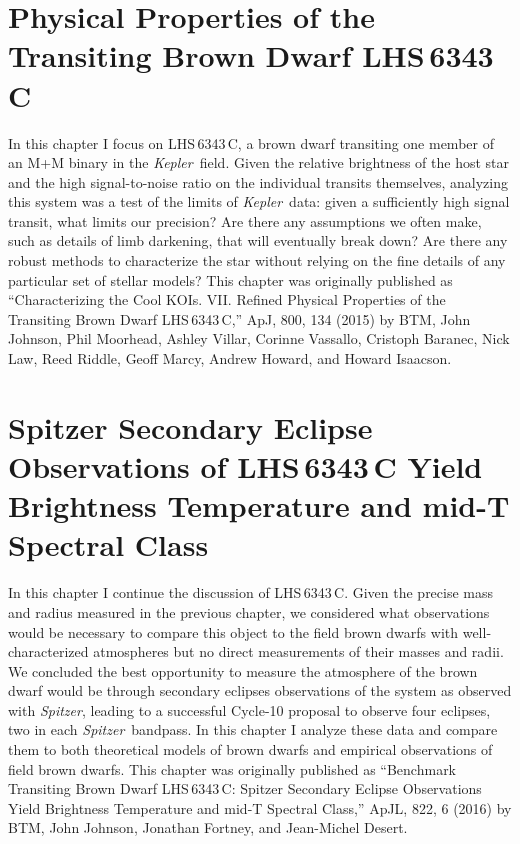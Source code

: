\documentclass[12pt]{caltech_thesis}
\newcommand{\kep}{{\textit {Kepler}}}
\newcommand{\spitz}{{\textit {Spitzer}}}
\begin{document}


\chapter{Physical Properties of the Transiting Brown Dwarf LHS\,6343\,C}
\label{chap:lhs1}


In this chapter I focus on LHS\,6343\,C, a brown dwarf transiting one member of an M+M binary in the \kep\ field.
Given the relative brightness of the host star and the high signal-to-noise ratio on the individual transits themselves,
analyzing this system was a test of the limits of \kep\ data: given a sufficiently high signal transit, what limits our precision?
Are there any assumptions we often make, such as details of limb darkening, that will eventually break down? 
Are there any robust methods to characterize the star without relying on the fine details of any particular set of stellar models?
This chapter was originally published as ``Characterizing the Cool KOIs. VII. Refined Physical Properties of the Transiting Brown Dwarf LHS\,6343\,C,'' ApJ, 800, 134 (2015) by BTM, John Johnson, Phil Moorhead, Ashley Villar, Corinne Vassallo,
Cristoph Baranec, Nick Law, Reed Riddle, Geoff Marcy, Andrew Howard, and Howard Isaacson.



\chapter{Spitzer Secondary Eclipse Observations of LHS\,6343\,C Yield Brightness Temperature and mid-T Spectral Class}

\label{chap:lhsspitz}
In this chapter I continue the discussion of LHS\,6343\,C.
Given the precise mass and radius measured in the previous chapter, we considered what observations would be necessary
to compare this object to the field brown dwarfs with well-characterized atmospheres but no direct measurements of
their masses and radii.
We concluded the best opportunity to measure the atmosphere of the brown dwarf would be through secondary eclipses
observations of the system as observed with \spitz, leading to a successful Cycle-10 proposal to observe four eclipses, 
two in each \spitz\ bandpass.
In this chapter I analyze these data and compare them to both theoretical models of brown dwarfs and empirical observations
of field brown dwarfs.
This chapter was originally published as ``Benchmark Transiting Brown Dwarf LHS\,6343\,C: Spitzer Secondary Eclipse Observations Yield Brightness Temperature and mid-T Spectral Class,'' ApJL, 822, 6 (2016) by BTM, John Johnson,
Jonathan Fortney, and Jean-Michel Desert.
\end{document}
